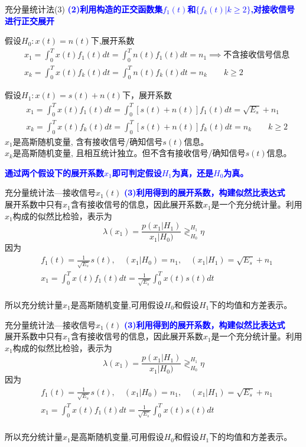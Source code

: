 \begin{frame}[shrink]{充分量统计法(3)}
\textbf{\textcolor{blue}{(2)利用构造的正交函数集$f_1(t)$和$\{f_k(t)|k\ge 2\}$,对接收信号进行正交展开}}
\begin{block}{假设$H_0:x(t)=n(t)$下,展开系数}
\begin{align*}
&x_1=\int_{0}^{T}x(t)f_1(t)dt=\int_{0}^{T}n(t)f_1(t)dt=n_1\implies\text{不含接收信号信息}\\
&x_k=\int_{0}^{T}x(t)f_k(t)dt=\int_{0}^{T}n(t)f_k(t)dt=n_k\qquad k\ge 2
\end{align*}
\end{block}
\begin{block}{假设$H_1:x(t)=s(t)+n(t)$下，展开系数}
\begin{align*}
&x_1=\int_{0}^{T}x(t)f_1(t)dt=\int_{0}^{T}[s(t)+n(t)]f_1(t)dt=\sqrt{E_s}+n_1\\
&x_k=\int_{0}^{T}x(t)f_k(t)dt=\int_{0}^{T}[s(t)+n(t)]f_k(t)dt=n_k\qquad k\ge 2
\end{align*}
$x_1$是高斯随机变量, 含有接收信号/确知信号$s(t)$信息。\\
$x_k$是高斯随机变量, 且相互统计独立。但不含有接收信号/确知信号$s(t)$信息。
\end{block}
\textbf{\textcolor{blue}{通过两个假设下的展开系数$x_1$即可判定假设$H_1$为真，还是$H_0$为真。}}
\end{frame}

\begin{frame}[shrink]{充分量统计法---接收信号$x_1(t)$}
\textbf{\textcolor{blue}{(3)利用得到的展开系数，构建似然比表达式
}}\\
展开系数中只有$x_1$含有接收信号的信息，因此展开系数$x_1$是一个充分统计量。利用$x_1$构成的似然比检验，表示为
\[\lambda(x_1)=\frac{p(x_1|H_1)}{x_1|H_0)}\mathop{\gtrless}_{H_0}^{H_1}\eta\]
因为
\begin{align*}
&f_1(t)=\frac{1}{\sqrt{E_s}}s(t),\quad (x_1|H_0)=n_1,\quad (x_1|H_1)=\sqrt{E_s}+n_1\\ &x_1=\int_{0}^{T}x(t)f_1(t)dt=\frac{1}{\sqrt{E_s}}\int_{0}^{T}x(t)s(t)dt
\end{align*}
~\\
所以充分统计量$x_1$是高斯随机变量,可用假设$H_0$和假设$H_1$下的均值和方差表示。
\end{frame}

\begin{frame}[shrink]{充分量统计法---接收信号$x_1(t)$}
\textbf{\textcolor{blue}{(3)利用得到的展开系数，构建似然比表达式
}}\\
展开系数中只有$x_1$含有接收信号的信息，因此展开系数$x_1$是一个充分统计量。利用$x_1$构成的似然比检验，表示为
\[\lambda(x_1)=\frac{p(x_1|H_1)}{x_1|H_0)}\mathop{\gtrless}_{H_0}^{H_1}\eta\]
因为
\begin{align*}
&f_1(t)=\frac{1}{\sqrt{E_s}}s(t),\quad (x_1|H_0)=n_1,\quad (x_1|H_1)=\sqrt{E_s}+n_1\\ &x_1=\int_{0}^{T}x(t)f_1(t)dt=\frac{1}{\sqrt{E_s}}\int_{0}^{T}x(t)s(t)dt
\end{align*}
~\\
所以充分统计量$x_1$是高斯随机变量,可用假设$H_0$和假设$H_1$下的均值和方差表示。
\end{frame}

